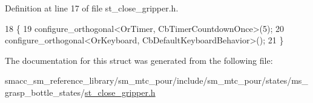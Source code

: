 Definition at line 17 of file st\+\_\+close\+\_\+gripper.\+h.


\begin{DoxyCode}
18     \{
19         configure\_orthogonal<OrTimer,  CbTimerCountdownOnce>(5);    
20         configure\_orthogonal<OrKeyboard, CbDefaultKeyboardBehavior>();
21     \}
\end{DoxyCode}


The documentation for this struct was generated from the following file\+:\begin{DoxyCompactItemize}
\item 
smacc\+\_\+sm\+\_\+reference\+\_\+library/sm\+\_\+mtc\+\_\+pour/include/sm\+\_\+mtc\+\_\+pour/states/ms\+\_\+grasp\+\_\+bottle\+\_\+states/\hyperlink{sm__mtc__pour_2include_2sm__mtc__pour_2states_2ms__grasp__bottle__states_2st__close__gripper_8h}{st\+\_\+close\+\_\+gripper.\+h}\end{DoxyCompactItemize}

